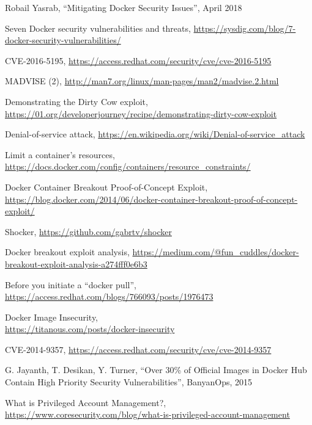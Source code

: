 \documentclass[a4paper,12pt]{article}
\begin{document}
\begin{thebibliography}{99}
Robail Yasrab, ``Mitigating Docker Security Issues'', April 2018

Seven Docker security vulnerabilities and threats,
\url{https://sysdig.com/blog/7-docker-security-vulnerabilities/}

CVE-2016-5195, \url{https://access.redhat.com/security/cve/cve-2016-5195} 

MADVISE (2), \url{http://man7.org/linux/man-pages/man2/madvise.2.html}

Demonstrating the Dirty Cow exploit,
\url{https://01.org/developerjourney/recipe/demonstrating-dirty-cow-exploit}

Denial-of-service attack,
\url{https://en.wikipedia.org/wiki/Denial-of-service_attack}

Limit a container's resources,
\url{https://docs.docker.com/config/containers/resource_constraints/}

Docker Container Breakout Proof-of-Concept Exploit,
\url{https://blog.docker.com/2014/06/docker-container-breakout-proof-of-concept-exploit/}

Shocker, \url{https://github.com/gabrtv/shocker}

Docker breakout exploit analysis,
\url{https://medium.com/@fun_cuddles/docker-breakout-exploit-analysis-a274fff0e6b3}

Before you initiate a ``docker pull'',
\url{https://access.redhat.com/blogs/766093/posts/1976473}

Docker Image Insecurity, \\ \url{https://titanous.com/posts/docker-insecurity}

CVE-2014-9357, \url{https://access.redhat.com/security/cve/cve-2014-9357}

G. Jayanth, T. Desikan, Y. Turner, ``Over 30\% of Official Images in Docker Hub
Contain High Priority Security Vulnerabilities'', BanyanOps, 2015

What is Privileged Account Management?,
\url{https://www.coresecurity.com/blog/what-is-privileged-account-management}


\end{thebibliography}
\end{document}

